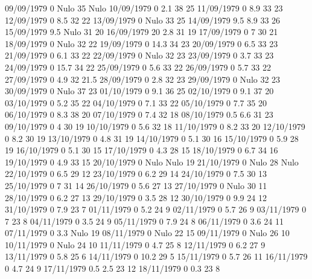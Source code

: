 09/09/1979  0     Nulo    35    Nulo
10/09/1979  0      2.1    38     25 
11/09/1979  0      8.9    33     23 
12/09/1979  0      8.5    32     22 
13/09/1979  0     Nulo    33     25 
14/09/1979  9.5    8.9    33     26 
15/09/1979  9.5   Nulo    31     20 
16/09/1979  20     2.8    31     19 
17/09/1979  0      7      30     21 
18/09/1979  0     Nulo    32     22 
19/09/1979  0      14.3   34     23 
20/09/1979  0      6.5    33     23 
21/09/1979  0      6.1    33     22 
22/09/1979  0     Nulo    32     23 
23/09/1979  0      3.7    33     23 
24/09/1979  0      15.7   34     22 
25/09/1979  0      5.6    33     22 
26/09/1979  0      5.7    33     22 
27/09/1979  0      4.9    32     21.5 
28/09/1979  0      2.8    32     23 
29/09/1979  0     Nulo    32     23 
30/09/1979  0     Nulo    37     23 
01/10/1979  0      9.1    36     25 
02/10/1979  0      9.1    37     20 
03/10/1979  0      5.2    35     22 
04/10/1979  0      7.1    33     22 
05/10/1979  0      7.7    35     20 
06/10/1979  0      8.3    38     20 
07/10/1979  0      7.4    32     18 
08/10/1979  0.5    6.6    31     23 
09/10/1979  0      4      30     19 
10/10/1979  0      5.6    32     18 
11/10/1979  0      8.2    33     20 
12/10/1979  0      8.2    30     19 
13/10/1979  0      4.8    31     19 
14/10/1979  0      5.1    30     16 
15/10/1979  0      5.9    28     19 
16/10/1979  0      5.1    30     15 
17/10/1979  0      4.3    28     15 
18/10/1979  0      6.7    34     16 
19/10/1979  0      4.9    33     15 
20/10/1979  0     Nulo   Nulo    19 
21/10/1979  0     Nulo    28    Nulo
22/10/1979  0      6.5    29     12 
23/10/1979  0      6.2    29     14 
24/10/1979  0      7.5    30     13 
25/10/1979  0      7      31     14 
26/10/1979  0      5.6    27     13 
27/10/1979  0     Nulo    30     11 
28/10/1979  0      6.2    27     13 
29/10/1979  0      3.5    28     12 
30/10/1979  0      9.9    24     12 
31/10/1979  0      7.9    23     7 
01/11/1979  0      5.2    24     9 
02/11/1979  0      5.7    26     9 
03/11/1979  0      7      23     8 
04/11/1979  0      3.5    24     9 
05/11/1979  0      7.9    24     8 
06/11/1979  0      3.6    24     11 
07/11/1979  0      3.3   Nulo    19 
08/11/1979  0     Nulo    22     15 
09/11/1979  0     Nulo    26     10 
10/11/1979  0     Nulo    24     10 
11/11/1979  0      4.7    25     8 
12/11/1979  0      6.2    27     9 
13/11/1979  0      5.8    25     6 
14/11/1979  0      10.2   29     5 
15/11/1979  0      5.7    26     11 
16/11/1979  0      4.7    24     9 
17/11/1979  0.5    2.5    23     12 
18/11/1979  0      0.3    23     8 
